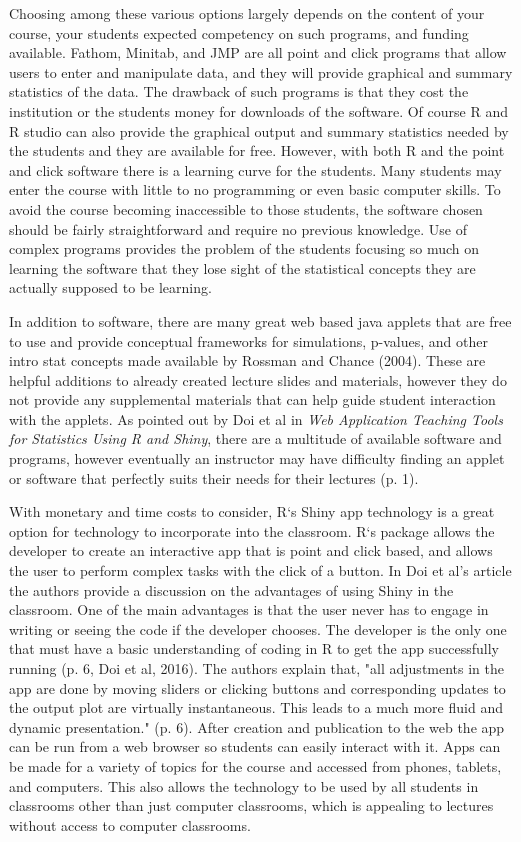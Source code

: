 \documentclass[11pt]{book}
\begin{document}
Choosing among these various options largely depends on the content of your course, your students expected competency on such programs, and funding available.  Fathom, Minitab, and JMP are all point and click programs that allow users to enter and manipulate data, and they will provide graphical and summary statistics of the data.  The drawback of such programs is that they cost the institution or the students money for downloads of the software.  Of course R and R studio can also provide the graphical output and summary statistics needed by the students and they are available for free.  However, with both R and the point and click software there is a learning curve for the students.    Many students may enter the course with little to no programming or even basic computer skills.   To avoid the course becoming inaccessible to those students, the software chosen should be fairly straightforward and require no previous knowledge.   Use of complex programs provides the problem of the students focusing so much on learning the software that they lose sight of the statistical concepts they are actually supposed to be learning.  

 In addition to software, there are many great web based java applets that are free to use and provide conceptual frameworks for simulations, p-values, and other intro stat concepts made available by Rossman and Chance (2004).  These are helpful additions to already created lecture slides and materials, however they do not provide any supplemental materials that can help guide student interaction with the applets.  As pointed out by Doi et al in \emph{Web Application Teaching Tools for Statistics Using R and Shiny}, there are a multitude of available software and programs, however eventually an instructor may have difficulty finding an applet or software that perfectly suits their needs for their lectures (p. 1).
 
 With monetary and time costs to consider, R`s Shiny app technology is a great option for technology to incorporate into the classroom.  R`s package allows the developer to create an interactive app that is point and click based, and allows the user to perform complex tasks with the click of a button.  In Doi et al's article the authors provide a discussion on the advantages of using Shiny in the classroom. One of the main advantages is that the user never has to engage in writing or seeing the code if the developer chooses.  The developer is the only one that must have a basic understanding of coding in R to get the app successfully running (p. 6, Doi et al, 2016).
 The authors explain that, "all adjustments in the app are done by moving sliders or clicking buttons and corresponding updates to the output plot are virtually instantaneous. This leads to a much more fluid and dynamic presentation." (p. 6). After creation and publication to the web the app can be run from a web browser so students can easily interact with it.  Apps can be made for a variety of topics for the course and accessed from phones, tablets, and computers.  This also allows the technology to be used by all students in classrooms other than just computer classrooms, which is appealing to lectures without access to computer classrooms.
\end{document}
